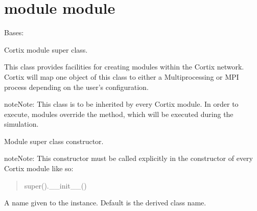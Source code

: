 \documentclass[letterpaper,10pt,openany,oneside,english]{sphinxmanual}
\begin{document}
\section{module module}
\label{\detokenize{src_rst/module:module-module}}\label{\detokenize{src_rst/module:module-module}}\label{\detokenize{src_rst/module::doc}}

\begin{fulllineitems}
\label{\detokenize{src_rst/module:module.Module}}
Bases: 

Cortix module super class.

This class provides facilities for creating modules within the Cortix network.
Cortix will map one object of this class to either a Multiprocessing or MPI
process depending on the user’s configuration.

\begin{sphinxadmonition}{note}{Note:}
This class is to be inherited by every Cortix module.
In order to execute, modules  override the  method, which will be
executed during the simulation.
\end{sphinxadmonition}

\begin{fulllineitems}
\label{\detokenize{src_rst/module:module.Module.__init__}}
Module super class constructor.

\begin{sphinxadmonition}{note}{Note:}
This constructor must be called explicitly in the constructor of every
Cortix module like so:
\begin{quote}

super().\_\_init\_\_()
\end{quote}
\end{sphinxadmonition}

\begin{fulllineitems}
\label{\detokenize{src_rst/module:module.Module.name}}
 \textendash{} A name given to the instance. Default is the derived class name.


\end{fulllineitems}
\end{fulllineitems}
\end{fulllineitems}
\end{document}
